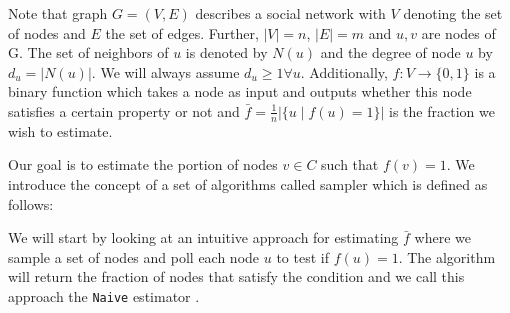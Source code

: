 Note that graph $G = (V,E)$ describes a social network with $V$ denoting the set of nodes and $E$ the set of edges. Further, $|V| = n$, $|E| = m$ and $u,v$ are nodes of G. The set of neighbors of $u$ is denoted by $N(u)$ and the degree of node $u$ by $d_u=|N(u)|$. We will always assume $d_u \geq 1  \forall u$. Additionally, $f : V \rightarrow \{0,1\}$ is a binary function which takes a node as input and outputs whether this node satisfies a certain property or not and $\bar{f} = \frac{1}{n}|\{u\;|\;f(u) = 1\}|$ is the fraction we wish to estimate.

Our goal is to estimate the portion of nodes $v \in C$ such that $f(v) = 1$.
We introduce the concept of a set of algorithms called sampler which is defined as follows:

We will start by looking at an intuitive approach for estimating $\bar{f}$ where we sample a set of nodes and poll each node $u$ to test if $f(u)=1$.
The algorithm will return the fraction of nodes that satisfy the condition and we call this approach the \texttt{Naive} estimator \cite{goldreich1997sample}.
